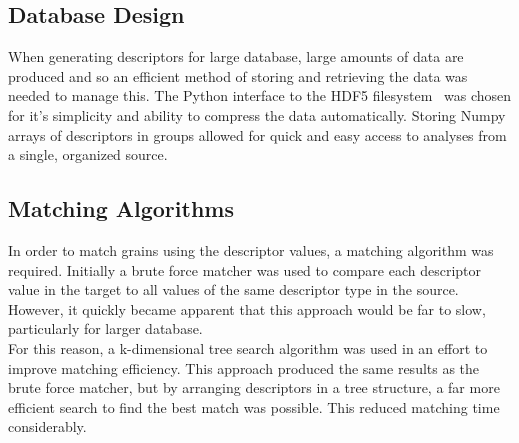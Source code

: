 \documentclass{scrartcl}
\begin{document}
    \subsection*{Database Design}
    When generating descriptors for large database, large amounts of data are
    produced and so an efficient method of storing and retrieving the data was
    needed to manage this. The Python interface to the HDF5
    filesystem~\parencite{Collette2016} was chosen for it's simplicity and
    ability to compress the data automatically. Storing Numpy arrays of
    descriptors in groups allowed for quick and easy access to analyses from a
    single, organized source.

    \subsection*{Matching Algorithms}
    In order to match grains using the descriptor values, a matching algorithm
    was required. Initially a brute force matcher was used to compare each
    descriptor value in the target to all values of the same descriptor type in
    the source. However, it quickly became apparent that this approach would be
    far to slow, particularly for larger database.\\
    For this reason, a k-dimensional tree search algorithm was used in an
    effort to improve matching efficiency.  This approach produced the same
    results as the brute force matcher, but by arranging descriptors in a tree
    structure, a far more efficient search to find the best match was possible.
    This reduced matching time considerably.
\end{document}
